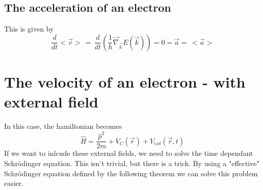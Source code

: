 \subsection{The acceleration of an electron}
This is given by
\begin{equation}
	\frac{d}{dt}<\vec{v}> \,= \,\frac{d}{dt}\left(\frac{1}{\hbar}\vec{\nabla}_{\vec{k}}E(\vec{k})\right) = 0 = \vec{a} =\, <\vec{a}>
\end{equation}

\section{The velocity of an electron - with external field}
In this case, the hamiltonian becomes
\begin{equation}
	\hat{H} = \frac{\hat{p}^2}{2m} + V_C(\vec{r}) + V_{ext}(\vec{r}, t) \label{eqn:hamiltonian_seq_velocity}
\end{equation}
If we want to inlcude these external fields, we need to solve the time dependant Schrödinger equation. This isn't trivial, but there is a trick. By using a "effective" Schrödinger equation defined by the following theorem we can solve this problem easier.
